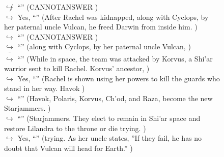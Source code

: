 \documentclass[11pt,a4paper, onecolumn]{article}
\begin{document}
\begin{figure}[t] \small \begin{tcolorbox}[boxsep=0pt,left=5pt,right=0pt,top=2pt,colback = yellow!5] \begin{dialogue}
 \small 
\colorbox{pink!25}{$\not\hookrightarrow$}
{ ``'' (CANNOTANSWER ) }
\\
\colorbox{pink!25}{$\hookrightarrow$}
\colorbox{red!25}{Yes,}
{ ``'' (After Rachel was kidnapped, along with Cyclops, by her paternal uncle Vulcan, he freed Darwin from inside him. ) }
\\
\colorbox{pink!25}{$\hookrightarrow$}
{ ``'' (CANNOTANSWER ) }
\\
\colorbox{pink!25}{$\hookrightarrow$}
{ ``'' (along with Cyclops, by her paternal uncle Vulcan, ) }
\\
\colorbox{pink!25}{ $\bar{\hookrightarrow}$}
{ ``'' (While in space, the team was attacked by Korvus, a Shi'ar warrior sent to kill Rachel. Korvus' ancestor, ) }
\\
\colorbox{pink!25}{$\hookrightarrow$}
\colorbox{red!25}{Yes,}
{ ``'' (Rachel is shown using her powers to kill the guards who stand in her way. Havok ) }
\\
\colorbox{pink!25}{$\hookrightarrow$}
{ ``'' (Havok, Polaris, Korvus, Ch'od, and Raza, become the new Starjammers. ) }
\\
\colorbox{pink!25}{$\hookrightarrow$}
{ ``'' (Starjammers. They elect to remain in Shi'ar space and restore Lilandra to the throne or die trying. ) }
\\
\colorbox{pink!25}{$\hookrightarrow$}
\colorbox{red!25}{Yes,}
{ ``'' (trying. As her uncle states, ''If they fail, he has no doubt that Vulcan will head for Earth.'' ) }
\\
 \end{dialogue}\end{tcolorbox}\end{figure}
\end{document}

